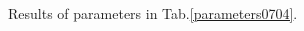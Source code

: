 \documentclass[onecolumn,aps,superscriptaddress,nofootinbib,floatfix]{revtex4}
\begin{document}
\begin{figure}[H]
	\caption{Results of parameters in Tab.\ref{parameters0704}.}
\end{figure}

	
	
	\begin{thebibliography}{99}

		
		
	\end{thebibliography}
	
\end{document}
